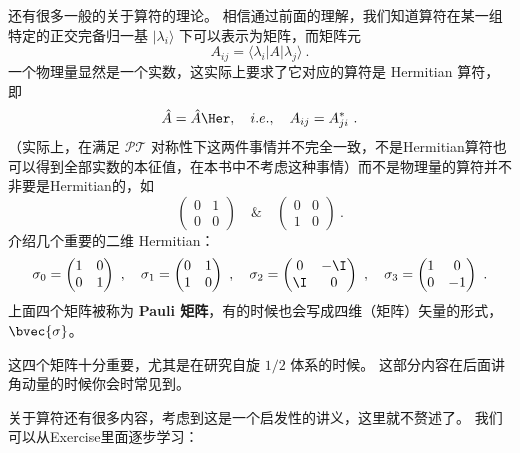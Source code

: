 还有很多一般的关于算符的理论。 相信通过前面的理解，我们知道算符在某一组特定的正交完备归一基 $|\lambda_i\rangle$ 下可以表示为矩阵，而矩阵元
\begin{equation}
A_{ij} = \langle\lambda_i|A|\lambda_j\rangle~.
\end{equation}
一个物理量显然是一个实数，这实际上要求了它对应的算符是 Hermitian 算符，即
\begin{equation}
\hat{A} = \hat{A}\Her,\quad i.e.,\quad A_{ij} = A_{ji}^*~.
\end{equation}
（实际上，在满足 $\mathcal{PT}$ 对称性下这两件事情并不完全一致，不是Hermitian算符也可以得到全部实数的本征值，在本书中不考虑这种事情）而不是物理量的算符并不非要是Hermitian的，如
\begin{equation}
\left(\begin{matrix}0 & 1\\0 & 0\end{matrix}\right) \quad \& \quad \left(\begin{matrix}0 & 0\\1 & 0\end{matrix}\right)~.
\end{equation}
介绍几个重要的二维 Hermitian：
\begin{equation}\label{eq_Basics_18}
\sigma_0 = \left(\begin{matrix}1 & 0\\0 & 1\end{matrix}\right)~,
\quad\sigma_1 = \left(\begin{matrix} 0 & 1\\1 & 0\end{matrix}\right)~,
\quad\sigma_2 = \left(\begin{matrix} 0 & -\I\\ \I & 0\end{matrix}\right)~,
\quad\sigma_3 = \left(\begin{matrix} 1 & 0\\0 & -1\end{matrix}\right)~.
\end{equation}
上面四个矩阵被称为 \textbf{Pauli 矩阵}，有的时候也会写成四维（矩阵）矢量的形式，$\bvec{\sigma}$。

这四个矩阵十分重要，尤其是在研究自旋 $1/2$ 体系的时候。 这部分内容在后面讲角动量的时候你会时常见到。

关于算符还有很多内容，考虑到这是一个启发性的讲义，这里就不赘述了。 我们可以从Exercise里面逐步学习：

